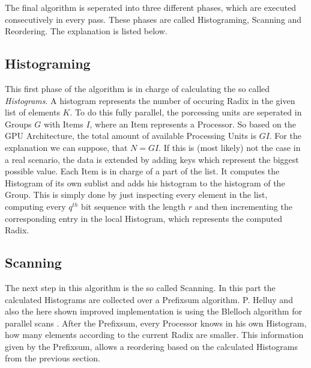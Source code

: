 \documentclass{llncs}
\begin{document}
The final algorithm is seperated into three different phases, which are executed consecutively in every pass. These phases are called Histograming, Scanning and Reordering. The explanation is listed below.



\subsection{Histograming}
This first phase of the algorithm is in charge of calculating the so called \textit{Histograms}. A histogram represents the number of occuring Radix in the given list of elements $K$. To do this fully parallel, the porcessing units are seperated in Groups $G$ with Items $I$, where an Item represents a Processor. So based on the GPU Architecture, the total amount of available Processing Units is $GI$. For the explanation we can suppose, that $N=GI$. If this is (most likely) not the case in a real scenario, the data is extended by adding keys which represent the biggest possible value. Each Item is in charge of a part of the list. It computes the Histogram of its own sublist and adds his histogram to the histogram of the Group. This is simply done by just inspecting every element in the list, computing every $q^{th}$ bit sequence with the length $r$ and then incrementing the corresponding entry in the local Histogram, which represents the computed Radix.


\subsection{Scanning}
The next step in this algorithm is the so called Scanning. In this part the calculated Histograms are collected over a Prefixsum algorithm. P. Helluy \cite{ocl-radix-helluy} and also the here shown improved implementation is using the Blelloch algorithm for parallel scans \cite{blelloch1989scans}. After the Prefixsum, every Processor knows in his own Histogram, how many elements according to the current Radix are smaller. This information given by the Prefixsum, allows a reordering based on the calculated Histograms from the previous section.
\end{document}
